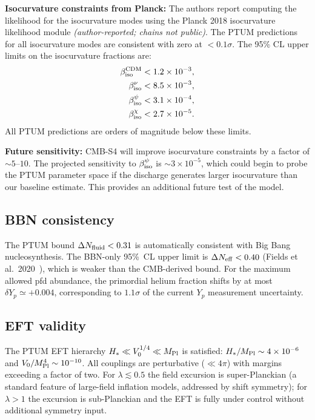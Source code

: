 \documentclass[epj]{svjour}
\begin{document}
\textbf{Isocurvature constraints from Planck:} The authors report
computing the likelihood for the isocurvature modes using the Planck
2018 isocurvature likelihood module \emph{(author-reported; chains not
public)}. The PTUM predictions for all
isocurvature modes are consistent with zero at \(<0.1\sigma\). The
95\% CL upper limits on the isocurvature fractions are:
\begin{align}
\beta_{\rm iso}^{\rm CDM} &< 1.2 \times 10^{-3}, \\
\beta_{\rm iso}^{\nu} &< 8.5 \times 10^{-3}, \\
\beta_{\rm iso}^{\psi} &< 3.1 \times 10^{-4}, \\
\beta_{\rm iso}^{\chi} &< 2.7 \times 10^{-5}.
\end{align}
All PTUM predictions are orders of magnitude below these limits.

\textbf{Future sensitivity:} CMB-S4 will improve isocurvature
constraints by a factor of \(\sim 5\)--\(10\). The projected
sensitivity to \(\beta_{\rm iso}^{\psi}\) is \(\sim 3 \times
10^{-5}\), which could begin to probe the PTUM parameter space if
the discharge generates larger isocurvature than our baseline
estimate. This provides an additional future test of the model.

\subsection{BBN consistency}

The PTUM bound \(\Delta N_{\rm fluid}<0.31\) is automatically
consistent with Big Bang nucleosynthesis. The BBN-only 95\%~CL
upper limit is \(\Delta N_{\rm eff}<0.40\)
(Fields et al.\ 2020~\cite{Fields2020}), which is weaker than the
CMB-derived bound. For the maximum allowed pfd abundance, the
primordial helium fraction shifts by at most
\(\delta Y_p\simeq+0.004\), corresponding to \(1.1\sigma\) of the
current \(Y_p\) measurement uncertainty.

\subsection{EFT validity}
\label{sec:eft_validity}

The PTUM EFT hierarchy \(H_*\ll V_0^{1/4}\ll M_{\rm Pl}\) is
satisfied: \(H_*/M_{\rm Pl}\sim4\times10^{-6}\) and
\(V_0/M_{\rm Pl}^4\sim10^{-10}\). All couplings are perturbative
(\(\ll4\pi\)) with margins exceeding a factor of two. For
\(\lambda\lesssim0.5\) the field excursion is super-Planckian
(a standard feature of large-field inflation models, addressed by
shift symmetry); for \(\lambda>1\) the excursion is sub-Planckian
and the EFT is fully under control without additional symmetry
input.
\end{document}
